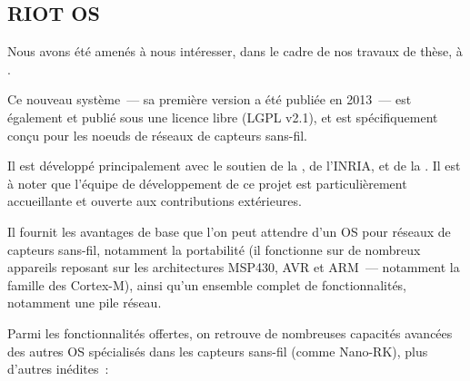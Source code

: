 \subsection{RIOT OS}
\label{SubsecRIOTOS}

Nous avons été amenés à nous intéresser, dans le cadre de nos travaux
de thèse, à  \cite{RIOT}.

Ce nouveau système~--- sa première version a été publiée en 2013~---
est également  et publié sous une licence libre
(LGPL v2.1), et est spécifiquement conçu pour les noeuds de réseaux
de capteurs sans-fil.

Il est développé principalement avec le soutien de la
, de l'INRIA, et de la
. Il est à noter que
l'équipe de développement de ce projet est particulièrement accueillante
et ouverte aux contributions extérieures.

\medskip

Il fournit les avantages de base que l'on peut attendre d'un OS pour
réseaux de capteurs sans-fil, notamment la portabilité (il fonctionne
sur de nombreux appareils reposant sur les architectures MSP430, AVR et
ARM~--- notamment la famille des Cortex-M), ainsi qu'un ensemble complet
de fonctionnalités, notamment une pile réseau.

Parmi les fonctionnalités offertes, on retrouve de nombreuses capacités
avancées des autres OS spécialisés dans les capteurs sans-fil (comme
Nano-RK), plus d'autres  inédites~:

